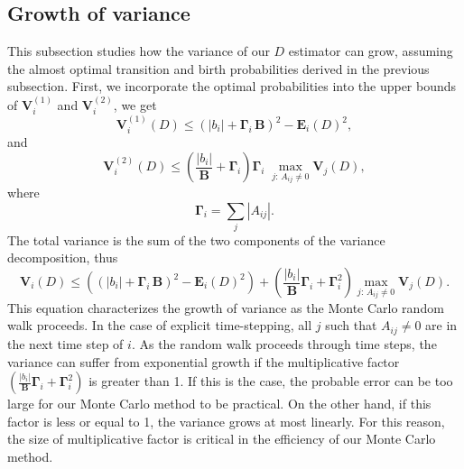     \subsection{Growth of variance}
        This subsection studies how the variance of our $D$ estimator can
        grow, assuming the almost optimal transition and birth probabilities
        derived in the previous subsection.  First, we incorporate the optimal
        probabilities into the upper bounds of $\mathbf{V}_i^{(1)}$ and
        $\mathbf{V}_i^{(2)}$, we get
        \[ \mathbf{V}_i^{(1)}(D)
            \le \left(|b_i| + \mathbf{\Gamma}_i\, \mathbf{B} \right)^2
                - \mathbf{E}_i(D)^2,
        \]
        and
        \[ \mathbf{V}_i^{(2)}(D)
            \le \left( \frac{|b_i|}{\mathbf{B}} + \mathbf{\Gamma}_i \right)
                \mathbf{\Gamma}_i\; \max_{j:\,A_{ij}\ne0} \mathbf{V}_j(D),
        \]
        where
        \[ \mathbf{\Gamma}_i = \sum_j |A_{ij}|.
        \]
        The total variance is the sum of the two components of the variance
        decomposition, thus
        \begin{equation} \label{vargrowth}
            \mathbf{V}_i(D)
            \le \left((|b_i| + \mathbf{\Gamma}_i\, \mathbf{B} )^2
                - \mathbf{E}_i(D)^2\right)
              + \left( \frac{|b_i|}
                {\mathbf{B}} \mathbf{\Gamma}_i + \mathbf{\Gamma}_i^2 \right)
                \max_{j:\,A_{ij}\ne0} \mathbf{V}_j(D).
        \end{equation}
        This equation characterizes the growth of variance as the Monte Carlo
        random walk proceeds.  In the case of explicit time-stepping, all
        $j$ such that $A_{ij}\ne 0$ are in the next time step of $i$.  As
        the random walk proceeds through time steps, the variance can suffer
        from exponential growth if the multiplicative factor
        $\left( \frac{|b_i|} {\mathbf{B}} \mathbf{\Gamma}_i
        + \mathbf{\Gamma}_i^2 \right)$ is greater than 1.  If this is the
        case, the probable error can be too large for our Monte Carlo method
        to be practical.  On the other hand, if this factor is less or equal
        to 1, the variance grows at most linearly.  For this reason, the size
        of multiplicative factor is critical in the efficiency of our Monte
        Carlo method.


